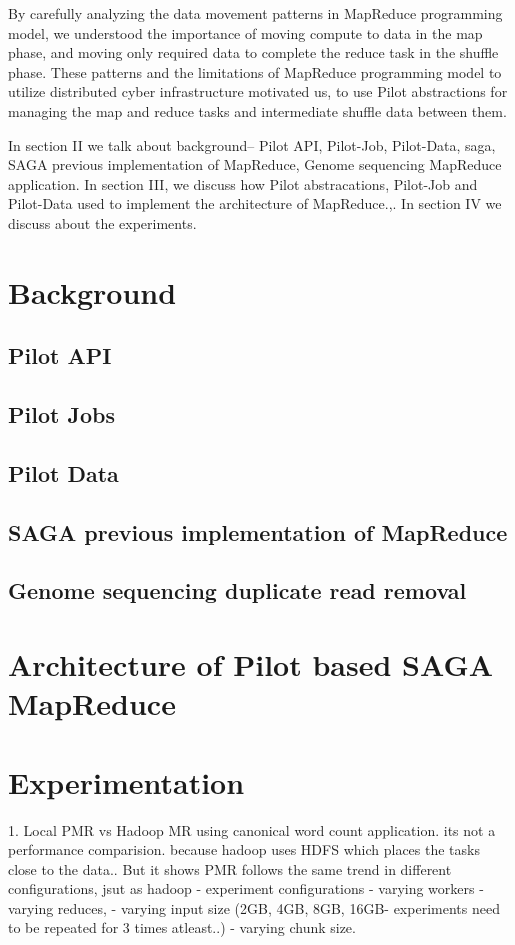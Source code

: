 \documentclass{acm_proc_article-sp}
\begin{document}
By carefully analyzing the data movement patterns in MapReduce programming model, we understood the importance of moving compute to data in the map phase,  and moving only required data to complete the reduce task in the shuffle phase. These patterns and the limitations of MapReduce programming model to utilize distributed cyber infrastructure motivated us, to use Pilot abstractions for managing the map and reduce tasks and intermediate shuffle data between them. 


In section II we talk about background-- Pilot API, Pilot-Job, Pilot-Data, saga, SAGA previous implementation of MapReduce, Genome sequencing MapReduce application. In section III, we discuss how Pilot abstracations, Pilot-Job and Pilot-Data used to implement the architecture of MapReduce.,. In section IV we discuss about the experiments.

\section{Background}
\subsection{Pilot API}
\subsection{Pilot Jobs}
\subsection{Pilot Data}
\subsection{SAGA previous implementation of MapReduce}
\subsection{Genome sequencing duplicate read removal}


\section{Architecture of Pilot based SAGA MapReduce}

\section{Experimentation}

1. Local PMR vs Hadoop MR using canonical word count application.
 its not a performance comparision. because hadoop uses HDFS which places the tasks close to the data.. But it shows PMR follows the same trend in different configurations, jsut as hadoop
     - experiment configurations
         - varying workers
         - varying reduces,
         - varying input size (2GB, 4GB, 8GB, 16GB- experiments need to be repeated for 3 times atleast..)
         - varying chunk size.
\end{document}
